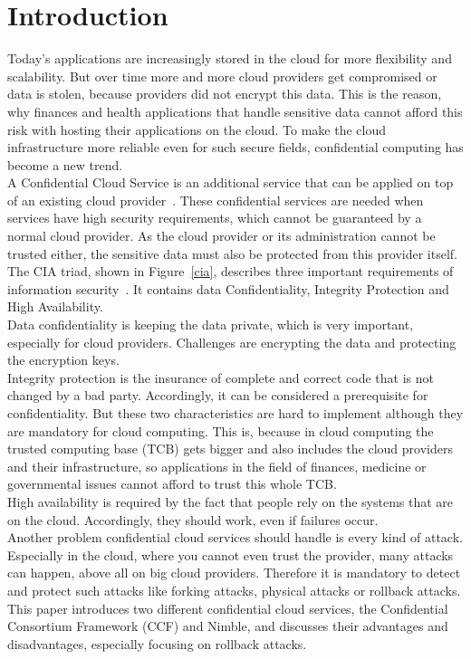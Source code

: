 \section{Introduction}
Today's applications are increasingly stored in the cloud for more flexibility and scalability. 
 But over time more and more cloud providers get compromised or data is stolen, because providers did not encrypt this data. This is the reason, why finances and health applications that handle sensitive data cannot afford this risk with hosting their applications on the cloud. To make the cloud infrastructure more reliable even for such secure fields, confidential computing has become a new trend.\\
 A Confidential Cloud Service is an additional service that can be applied on top of an existing cloud provider~\cite{confidentiality}. These confidential services are needed when services have high security requirements, which cannot be guaranteed by a normal cloud provider. As the cloud provider or its administration cannot be trusted either, the sensitive data must also be protected from this provider itself. \\
 The CIA triad,  shown in Figure~\ref{cia},  describes three important requirements of information security~\cite{ciaBook, cia}. It contains data Confidentiality, Integrity Protection and High Availability.\\
 Data confidentiality is keeping the data private, which is very important, especially for cloud providers. Challenges are encrypting the data and protecting the encryption keys.\\
 Integrity protection is the insurance of complete and correct code that is not changed by a bad party. Accordingly, it can be considered a prerequisite for confidentiality. But these two characteristics are hard to implement although they are mandatory for cloud computing. This is, because in cloud computing the trusted computing base (TCB) gets bigger and also includes the cloud providers and their infrastructure, so applications in the field of finances, medicine or governmental issues cannot afford to trust this whole TCB.\\
 High availability is required by the fact that people rely on the systems that are on the cloud. Accordingly, they should work, even if failures occur.\\
 Another problem confidential cloud services should handle is every kind of attack. Especially in the cloud, where you cannot even trust the provider, many attacks can happen, above all on big cloud providers. Therefore it is mandatory to detect and protect such attacks like forking attacks, physical attacks or rollback attacks.\\
 This paper introduces two different confidential cloud services, the Confidential Consortium Framework (CCF) and Nimble,  and discusses their advantages and disadvantages, especially focusing on rollback attacks. 
	 